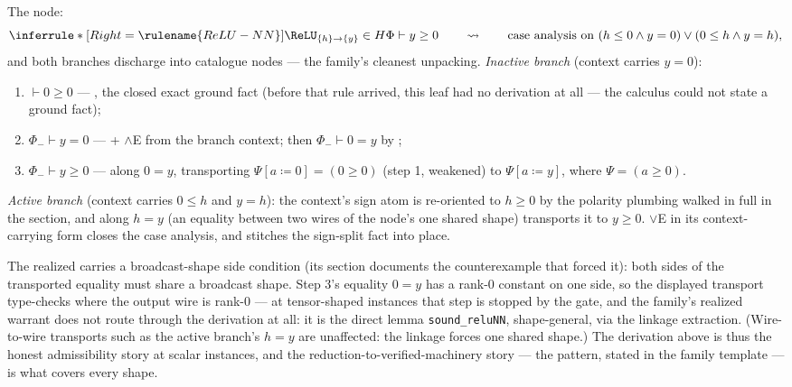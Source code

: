 

\begin{brecipe}
\label{rec:relunn-instance}
The node:
\[
\inferrule*[Right=\rulename{ReLU-NN}]{
  \ReLU_{\{h\}\to\{y\}} \in H
}{
  \Phi \vdash y \geq 0
}
\qquad\rightsquigarrow\qquad
\text{case analysis on }
(h \leq 0 \wedge y = 0) \vee (0 \leq h \wedge y = h),
\]
and both branches discharge into catalogue nodes --- the family's
cleanest unpacking. \emph{Inactive branch} (context carries $y = 0$):
\begin{enumerate}
\item $\vdash 0 \geq 0$ --- , the closed exact
  ground fact (before that rule arrived, this leaf had no derivation at
  all --- the calculus could not state a ground fact);
\item $\Phi_{-} \vdash y = 0$ ---  + $\wedge$E from the
  branch context; then $\Phi_{-} \vdash 0 = y$ by ;
\item $\Phi_{-} \vdash y \geq 0$ ---  along $0 = y$,
  transporting $\Psi[a \coloneqq 0] = (0 \geq 0)$ (step 1, weakened)
  to $\Psi[a \coloneqq y]$, where $\Psi = (a \geq 0)$.
\end{enumerate}
\emph{Active branch} (context carries $0 \leq h$ and $y = h$): the
context's sign atom is re-oriented to $h \geq 0$ by the polarity
plumbing walked in full in the  section, and
 along $h = y$ (an equality between two wires of the
node's one shared shape) transports it to $y \geq 0$. $\vee$E in its
context-carrying form closes the case analysis, and 
stitches the sign-split fact into place.
\end{brecipe}

\begin{bremark}
\label{rem:relunn-shapescope}
The realized  carries a broadcast-shape side
condition (its section documents the counterexample that forced it):
both sides of the transported equality must share a broadcast shape.
Step 3's equality $0 = y$ has a rank-$0$ constant on one side, so the
displayed transport type-checks where the output wire is rank-$0$ ---
at tensor-shaped instances that step is stopped by the gate, and the family's
realized warrant does not route through the derivation at all: it is
the direct lemma \texttt{sound\_reluNN}, shape-general, via the
linkage extraction. (Wire-to-wire transports such as the active
branch's $h = y$ are unaffected: the linkage forces one shared shape.)
The derivation above is thus the honest admissibility story at scalar
instances, and the reduction-to-verified-machinery story --- the
 pattern, stated in the family template --- is
what covers every shape.
\end{bremark}

